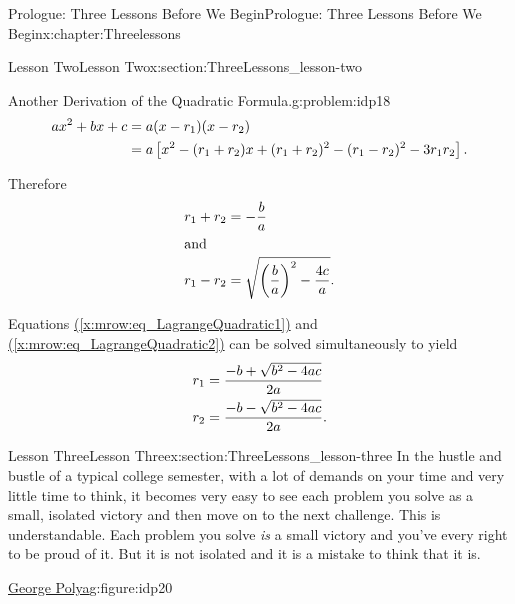 \begin{chapterptx}{Prologue: Three Lessons Before We Begin}{}{Prologue: Three Lessons Before We Begin}{}{}{x:chapter:Threelessons}
\begin{sectionptx}{Lesson Two}{}{Lesson Two}{}{}{x:section:ThreeLessons_lesson-two}
\begin{problem}{Another Derivation of the Quadratic Formula.}{g:problem:idp18}
			\begin{align*}
				ax^2+bx+c & = a(x-r_1)(x-r_2)\\
				& = a\left[x^2-(r_1+r_2)x+(r_1+r_2)^2-(r_1-r_2)^2-3r_1r_2\right]\text{.}
			\end{align*}
			\par
			Therefore%
			\begin{align}
				r_1+r_2& = -\frac{b}{a}\label{x:mrow:eq_LagrangeQuadratic1}\\
				\intertext{and}
				r_1-r_2 & = \sqrt{\left(\frac{b}{a}\right)^2-\frac{4c}{a}}\text{.}\label{x:mrow:eq_LagrangeQuadratic2}
			\end{align}
			\par
			Equations \hyperref[x:mrow:eq_LagrangeQuadratic1]{({\xreffont\ref{x:mrow:eq_LagrangeQuadratic1}})} and \hyperref[x:mrow:eq_LagrangeQuadratic2]{({\xreffont\ref{x:mrow:eq_LagrangeQuadratic2}})} can be solved simultaneously to yield%
			\begin{align*}
				r_1& =\frac{-b+\sqrt{b^2-4ac}}{2a}\\
				r_2& =\frac{-b-\sqrt{b^2-4ac}}{2a}\text{.}
			\end{align*}
		\end{problem}
	\end{sectionptx}
	\typeout{************************************************}
	\typeout{************************************************}
	\begin{sectionptx}{Lesson Three}{}{Lesson Three}{}{}{x:section:ThreeLessons_lesson-three}
		In the hustle and bustle of a typical college semester, with a lot of demands on your time and very little time to think, it becomes very easy to see each problem you solve as a small, isolated victory and then move on to the next challenge. This is understandable. Each problem you solve \emph{is} a small victory and you've every right to be proud of it. But it is not isolated and it is a mistake to think that it is.%
		\begin{figureptx}{\href{https://mathshistory.st-andrews.ac.uk/Biographies/Polya/}{George Polya}\protect\footnotemark{}}{g:figure:idp20}{}%
			\begin{image}{0.36}{0.28}{0.36}%

\end{image}
\end{figureptx}
\end{sectionptx}
\end{chapterptx}
